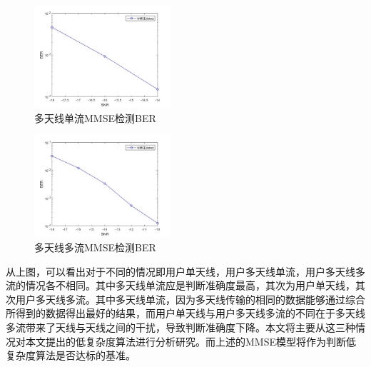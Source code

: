\documentclass[bachelor,nocolorlinks, printoneside]{seuthesis} %
\begin{document}
\begin{Main}
\begin{figure}[htbp!]
	\centering \includegraphics[width=0.45\textwidth]{img/3_3.jpg} \caption{多天线单流MMSE检测BER}
\end{figure}

\begin{figure}[htbp!]
	\centering \includegraphics[width=0.45\textwidth]{img/3_8.jpg} \caption{多天线多流MMSE检测BER}
\end{figure}
从上图，可以看出对于不同的情况即用户单天线，用户多天线单流，用户多天线多流的情况各不相同。其中多天线单流应是判断准确度最高，其次为用户单天线，其次用户多天线多流。其中多天线单流，因为多天线传输的相同的数据能够通过综合所得到的数据得出最好的结果，而用户单天线与用户多天线多流的不同在于多天线多流带来了天线与天线之间的干扰，导致判断准确度下降。本文将主要从这三种情况对本文提出的低复杂度算法进行分析研究。而上述的MMSE模型将作为判断低复杂度算法是否达标的基准。


\end{Main}
\end{document}
